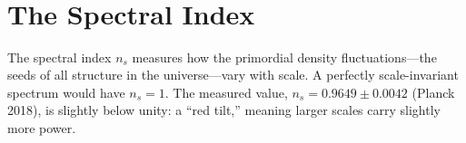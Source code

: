 \documentclass[11pt,a4paper]{book}
\begin{document}
\begin{code}
\>[0]\AgdaSpace{}%
\AgdaSymbol{=}\AgdaSpace{}%
\AgdaSpace{}%
\AgdaSpace{}%
%
\>[46]\<%
\\
%
\\[\AgdaEmptyExtraSkip]%
\>[0]\<%
\\
%
\\[\AgdaEmptyExtraSkip]%
\>[0]\AgdaSpace{}%
\AgdaSymbol{:}\AgdaSpace{}%
\<%
\\
\>[0]\AgdaSpace{}%
\AgdaSymbol{=}\AgdaSpace{}%
%
\>[29]\<%
\\
%
\\[\AgdaEmptyExtraSkip]%
\>[0]\AgdaSpace{}%
\AgdaSymbol{:}\AgdaSpace{}%
\<%
\\
\>[0]\AgdaSpace{}%
\AgdaSymbol{=}\AgdaSpace{}%
%
\>[23]\<%
\\
%
\\[\AgdaEmptyExtraSkip]%
\>[0]\AgdaSpace{}%
\AgdaSymbol{:}\AgdaSpace{}%
\<%
\\
\>[0]\AgdaSpace{}%
\AgdaSymbol{=}\AgdaSpace{}%
\AgdaSymbol{(}\AgdaSpace{}%
\AgdaSymbol{)}\AgdaSpace{}%
\AgdaOperator{\AgdaInductiveConstructor{/}}\AgdaSpace{}%
\AgdaSymbol{(}\AgdaSpace{}%
\AgdaSymbol{(}\AgdaSpace{}%
\AgdaSpace{}%
\AgdaSymbol{))}%
\>[83]\<%
\end{code}

\chapter{The Spectral Index}
\label{ch:spectral-index}

The spectral index $n_s$ measures how the primordial density fluctuations---the seeds of all structure in the universe---vary with scale. A perfectly scale-invariant spectrum would have $n_s = 1$. The measured value, $n_s = 0.9649 \pm 0.0042$ (Planck 2018), is slightly below unity: a ``red tilt,'' meaning larger scales carry slightly more power.
\end{document}
